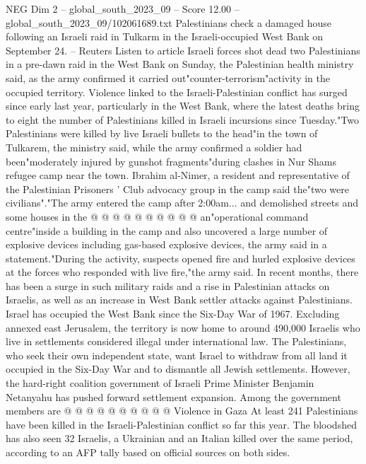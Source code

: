 \begin{textsample}{NEG Dim 2 – global\_south\_2023\_09 – Score 12.00 – global\_south\_2023\_09/102061689.txt}  \label{ex:f2_neg_003}
Palestinians check a damaged house following an Israeli raid in Tulkarm in the Israeli-occupied West Bank on September 24. -- Reuters Listen to article Israeli forces shot dead two Palestinians in a pre-dawn raid in the West Bank on Sunday, the Palestinian health ministry said, as the army confirmed it carried out"counter-terrorism"activity in the occupied territory.
Violence linked to the Israeli-Palestinian conflict has surged since early last year, particularly in the West Bank, where the latest deaths bring to eight the number of Palestinians killed in Israeli incursions since Tuesday."Two Palestinians were killed by live Israeli bullets to the head"in the town of Tulkarem, the ministry said, while the army confirmed a soldier had been"moderately injured by gunshot fragments"during clashes in Nur Shams refugee camp near the town.
Ibrahim al-Nimer, a resident and representative of the Palestinian Prisoners ' Club advocacy group in the camp said the"two were civilians"."The army entered the camp after 2:00am... and demolished streets and some houses in the @ @ @ @ @ @ @ @ @ @ an"operational command centre"inside a building in the camp and also uncovered a large number of explosive devices including gas-based explosive devices, the army said in a statement."During the activity, suspects opened fire and hurled explosive devices at the forces who responded with live fire,"the army said.
In recent months, there has been a surge in such military raids and a rise in Palestinian attacks on Israelis, as well as an increase in West Bank settler attacks against Palestinians.
Israel has occupied the West Bank since the Six-Day War of 1967.
Excluding annexed east Jerusalem, the territory is now home to around 490,000 Israelis who live in settlements considered illegal under international law.
The Palestinians, who seek their own independent state, want Israel to withdraw from all land it occupied in the Six-Day War and to dismantle all Jewish settlements.
However, the hard-right coalition government of Israeli Prime Minister Benjamin Netanyahu has pushed forward settlement expansion.
Among the government members are @ @ @ @ @ @ @ @ @ @ Violence in Gaza At least 241 Palestinians have been killed in the Israeli-Palestinian conflict so far this year.
The bloodshed has also seen 32 Israelis, a Ukrainian and an Italian killed over the same period, according to an AFP tally based on official sources on both sides.

\end{textsample}
